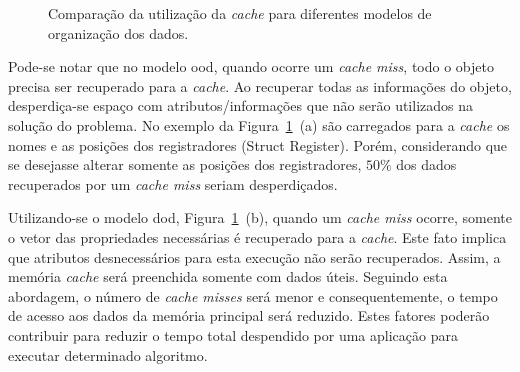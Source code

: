 \begin{figure}[h!t]
    \caption[Comparação da utilização da \textit{cache}]{Comparação da utilização da \textit{cache} para diferentes modelos de organização dos dados.}
    \label{fig:cache_register_clustering}
\end{figure}

Pode-se notar que no modelo \ac{ood}, quando ocorre um \textit{cache miss}, todo o objeto precisa ser recuperado para a \textit{cache}. Ao recuperar todas as informações do objeto, desperdiça-se espaço com atributos/informações que não serão utilizados na solução do problema. No exemplo da Figura~\ref{fig:cache_register_clustering}~(a) são carregados para a \textit{cache} os nomes e as posições dos registradores (Struct Register). Porém, considerando que se desejasse alterar somente as posições dos registradores, $50\%$ dos dados recuperados por um \textit{cache miss} seriam desperdiçados.



Utilizando-se o modelo \ac{dod}, Figura~\ref{fig:cache_register_clustering}~(b), quando um \textit{cache miss} ocorre, somente o vetor das propriedades necessárias é recuperado para a \textit{cache}. Este fato implica que atributos desnecessários para esta execução não serão recuperados. Assim, a memória \textit{cache} será preenchida somente com dados úteis.
Seguindo esta abordagem, o número de \textit{cache misses} será menor e consequentemente, o tempo de acesso aos dados da memória principal será reduzido. Estes fatores poderão contribuir para reduzir o tempo total despendido por uma aplicação para executar determinado algoritmo.



